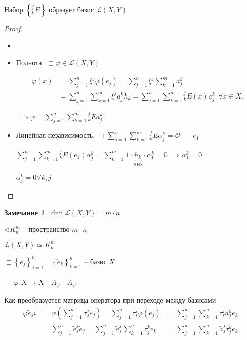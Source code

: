\documentclass{book}
\newcommand{\tl}[1]{\widetilde{#1}}
\theoremstyle{definition}
\newtheorem*{note}{Замечание}
\begin{document}
\begin{theorem}
    Набор $\left\{ _k^jE \right\} $ образует базис $\mathscr{L}(X, Y)$
\end{theorem}
\begin{proof}
    \begin{itemize}
        \item []
        \item Полнота. $\sqsupset \varphi\in \mathscr{L}(X, Y)$

        \begin{align*}            
            \varphi(x) &= \sum_{j=1}^{n} \xi^j\varphi(e_j) = \sum_{j=1}^{n} \xi^j \sum_{k=1}^{m} a_j^k \\
            &= \sum_{j=1}^{n} \sum_{k=1}^{m} \xi^ja_j^kh_k = \sum_{j=1}^{n} \sum_{k=1}^{m} {}_k^jE(x)a_j^k\ \ \forall x\in X
        .\end{align*}


            $ \implies  \varphi = \sum_{j=1}^{n} \sum_{k=1}^{m} {}_k^jEa_j^k$
        \item Линейная независимость. 
            $\sqsupset \sum_{j=1}^{n} \sum_{k=1}^{m}{}_k^jE\alpha_j^k = \mathscr{O}\quad \mid e_1$ 

            $\sum_{j=1}^{n} \sum_{k=1}^{m}{}_k^jE\left( e_1 \right) \alpha_j^k = \sum_{k=1}^{m} 1\cdot \underbrace{h_k}_{\text{ЛНЗ}}\cdot \alpha_1^k = 0 \implies \alpha_1^k = 0$ 

            $\alpha_j^k = 0 \forall k, j$
    \end{itemize}
\end{proof}

\begin{note}
    $\dim \mathscr{L}(X, Y) = m\cdot n$

    $\sphericalangle K_n^m$ -- пространство $m \cdot  n$
\end{note}

\begin{lemma}
    $\mathscr{L}(X, Y) \simeq K_n^m$
\end{lemma}

$\sqsupset \left\{ e_j \right\} _{j=1}^n\quad  \left\{ \tl e_k \right\} _{k=1}^n$ -- базис $X$ 

$\sqsupset \varphi:X\to X\quad A_{\varphi}\quad \tl A_{\varphi}$

Как преобразуется матрица оператора при переходе между базисами
\begin{align*} 
    \varphi \tl e_s i&= \varphi\left( \sum_{j=1}^{n} \tau^j_se_j \right) =\sum_{j=1}^{n} \tau^j_s \varphi\left( e_j \right) &= \sum_{j=1}^{n} \sum_{k=1}^{n} \tau^j_s a^k_je_k\\
                     &= \sum_{j=1}^{n} \tl a_s^j\tl e_j = \sum_{j=1}^{n} \tl a^j_s \sum_{k=1}^{n} \tau_j^k e_k &= \sum_{j=1}^{n} \sum_{k=1}^{n} \tl a_s^j\tau_j^ke_k
.\end{align*}
\end{document}
